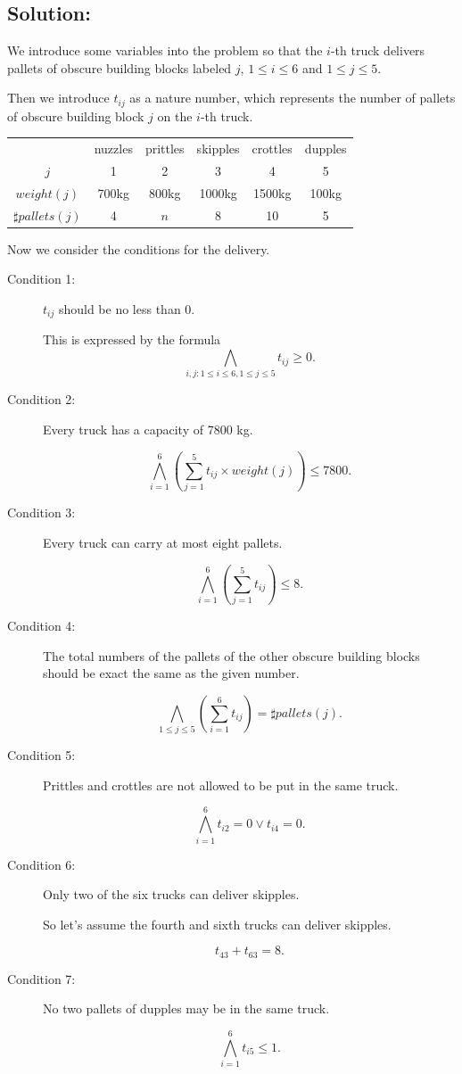 \documentclass[11pt]{article}
\begin{document}
\vspace{4mm}

\subsection*{Solution:}

We introduce some variables into the problem so that the $i$-th truck delivers pallets of obscure building blocks labeled $j$, $1\leq i \leq6$ and $1\leq j \leq5$.

Then we introduce $t_{ij}$ as a nature number, which represents the number of pallets of obscure building block $j$ on the $i$-th truck.
\begin{center}
\begin{tabular}{|c|c|c|c|c|c|}
  \hline
    & nuzzles & prittles & skipples & crottles & dupples \\
  $j$ & 1 & 2 & 3 & 4 & 5 \\
  $weight(j)$ & 700kg & 800kg & 1000kg & 1500kg & 100kg \\
  $\sharp pallets(j)$ & 4 & $n$ & 8 & 10 & 5 \\
  \hline
\end{tabular}
\end{center}

Now we consider the conditions for the delivery.

\begin{description}
  \item[Condition 1:] $t_{ij}$ should be no less than $0$.

  This is expressed by the formula
  \[ \bigwedge_{i,j:1 \leq i \leq 6, 1 \leq j \leq 5} t_{ij} \geq 0.\]
  \item[Condition 2:] Every truck has a capacity of 7800 kg.

  \[ \bigwedge_{i=1}^6  (\sum_{j=1}^5 t_{ij} \times weight(j)) \leq 7800 .\]
  \item[Condition 3:] Every truck can carry at most eight pallets.

  \[ \bigwedge_{i=1}^6 (\sum_{j=1}^5 t_{ij}) \leq 8 .\]
  \item[Condition 4:] The total numbers of the pallets of the other obscure building blocks should be exact the same as the given number.

  \[ \bigwedge_{1\leq j \leq5} (\sum_{i=1}^6 t_{ij}) = \sharp pallets(j) .\]

  \item[Condition 5:] Prittles and crottles are not allowed to be put in the same truck.

  \[ \bigwedge_{i=1}^6 t_{i2}=0 \vee t_{i4}=0 .\]
  \item[Condition 6:] Only two of the six trucks can deliver skipples.

      So let's assume the fourth and sixth trucks can deliver skipples.

  \[ t_{43} + t_{63} = 8 .\]
  \item[Condition 7:] No two pallets of dupples may be in the same truck.

  \[ \bigwedge_{i=1}^6 t_{i5} \leq 1 .\]
\end{description}
\end{document}

